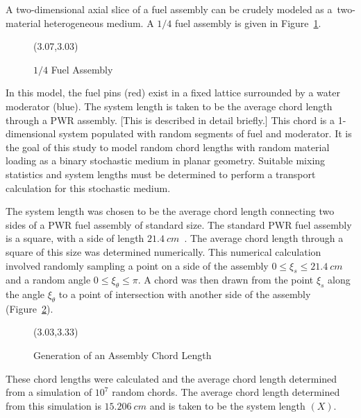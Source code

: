 \noindent
	\indent A two-dimensional axial slice of a fuel assembly can be crudely modeled as a~two-material
	heterogeneous medium.  A ${1/4}$ fuel assembly is given in Figure~\ref{fig:quart-assem}.
	\begin{figure}[htbp]
		\begin{center}
			\begin{minipage}[t]{4in}
			\centering
			\begin{picture}(3.07,3.03)
			\end{picture}
			\caption{\label{fig:quart-assem} ${1/4}$ Fuel Assembly}
			\end{minipage} %
		\end{center}
	\end{figure}
	In this model, the fuel pins (red) exist in a fixed lattice surrounded by a water moderator (blue).  The system
	length is taken to be the average chord length through a PWR assembly.  [This is described in detail briefly.]
	This chord is a 1-dimensional system
	populated with random segments of fuel and moderator.  It is the goal of this study to model random
	chord lengths with random material loading as a binary stochastic medium in planar geometry.  Suitable
	mixing statistics and system lengths must be determined to perform a transport calculation for this
	stochastic medium.
	
\noindent
	\indent The system length was chosen to be the average chord length connecting two sides of
	a PWR fuel assembly of standard size.  The standard PWR fuel assembly is a square, with a side of length
	${21.4 \ cm}$~\cite{Dud:76}.  The average chord length through a square of this size was determined
	numerically.  This numerical calculation involved randomly sampling a point on a side of the assembly
	${0 \le \xi_s \le 21.4 \ cm}$ and a random angle ${0 \le \xi_\theta \le \pi}$.  A chord was then drawn from the
	point ${\xi_s}$ along the angle ${\xi_\theta}$ to a point of intersection with another side of the assembly
	(Figure~\ref{fig:crd-lnth}).
	\begin{figure}[htbp]
		\begin{center}
			\begin{minipage}[t]{4in}
			\centering
			\begin{picture}(3.03,3.33)
			\end{picture}
			\caption{\label{fig:crd-lnth} Generation of an Assembly Chord Length}
			\end{minipage} %
		\end{center}
	\end{figure}	
	These chord lengths were calculated and the average chord length determined from a simulation
	of ${10^7}$ random chords.  The average chord length determined from this simulation is ${15.206 \ cm}$
	and is taken to be the system length ${(X)}$.
	
